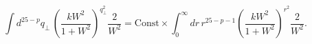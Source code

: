 \begin{equation}\label{eq:MomentumDependentMassless}
  \int d^{25-p}q_{\bot}\, \left(\frac{k W^2}{1+W^2}\right)^{q_{\bot}^2}
  \frac{2}{W^2}
 = \text{Const} \times \int_{0}^\infty dr \, r^{25-p-1}
\left(\frac{k W^2}{1+W^2}\right)^{r^2}
  \frac{2}{W^2}.
\end{equation}


